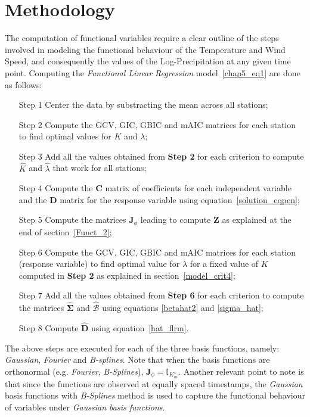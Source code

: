 \section{Methodology}\label{methodoly}
The computation of functional variables require a clear outline of the steps involved in modeling the functional behaviour of the Temperature and Wind Speed, and consequently the values of the Log-Precipitation at any given time point. Computing the \textit{Functional Linear Regression} model~\eqref{chap5_eq1} are done as follows:
\begin{itemize}
\item[Step 1] Center the data by substracting the mean across all stations;
\item[Step 2] Compute the GCV, GIC, GBIC and mAIC matrices for each station to find optimal values for $K$ and $\lambda$;
\item[Step 3] Add all the values obtained from \textbf{Step 2} for each criterion to compute $\hat{K}$ and $\hat{\lambda}$ that work for all stations;
\item[Step 4] Compute the $\bm{C}$ matrix of coefficients for each independent variable and the $\bm{D}$ matrix for the response variable using equation~\eqref{solution_eqpen};
\item[Step 5] Compute the matrices $\bm{J}_{\phi}$ leading to compute $\bm{Z}$ as explained at the end of section~\ref{Funct_2};
\item[Step 6] Compute the GCV, GIC, GBIC and mAIC matrices for each station (response variable) to find optimal value for $\lambda$ for a fixed value of $K$ computed in \textbf{Step 2} as explained in section~\ref{model_crit4};
\item[Step 7] Add all the values obtained from \textbf{Step 6} for each criterion to compute the matrices $\hat{\bm{\Sigma}}$ and $\hat{\bm{\mathcal{B}}}$ using equations \eqref{betahat2} and \eqref{sigma_hat};
\item[Step 8] Compute $\hat{\bm{D}}$ using equation~\eqref{hat_flrm}.
\end{itemize}
\clearpage
The above steps are executed for each of the three basis functions, namely: \textit{Gaussian}, \textit{Fourier} and \textit{B-splines}. Note that when the basis functions are orthonormal (e.g. \textit{Fourier}, \textit{B-Splines}), $\bm{J}_{\phi} = \mathbb{I}_{K^x_m}$. Another relevant point to note is that since the functions are observed at equally spaced timestamps, the \textit{Gaussian} basis functions with \textit{B-Splines} method is used to capture the functional behaviour of variables under \textit{Gaussian basis functions}.\\ 
